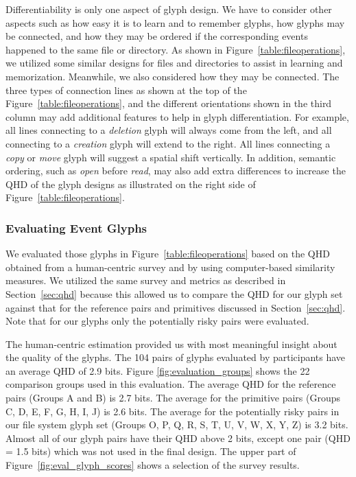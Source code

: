 Differentiability is only one aspect of glyph design.
We have to consider other aspects such as how easy it is to learn and to remember glyphs, how glyphs may be connected, and how they may be ordered if the corresponding events happened to the same file or directory.
As shown in Figure~\ref{table:fileoperations}, we utilized some similar designs for files and directories to assist in learning and memorization.
Meanwhile, we also considered how they may be connected.
The three types of connection lines as shown at the top of the Figure~\ref{table:fileoperations}, and the different orientations shown in the third column may add additional features to help in glyph differentiation.
For example, all lines connecting to a \emph{deletion} glyph will always come from the left, and all connecting to a \emph{creation} glyph will extend to the right.
All lines connecting a \emph{copy} or \emph{move} glyph will suggest a spatial shift vertically.
In addition, semantic ordering, such as \emph{open} before \emph{read}, may also add extra differences to increase the QHD of the glyph designs as illustrated on the right side of Figure~\ref{table:fileoperations}.

\subsubsection{Evaluating Event Glyphs}
\label{sec:eval_glyphs}


We evaluated those glyphs in Figure~\ref{table:fileoperations} based on the QHD obtained from a human-centric survey and by using computer-based similarity measures.
We utilized the same survey and metrics as described in Section~\ref{sec:qhd} because this allowed us to compare the QHD for our glyph set against that for the reference pairs and primitives discussed in Section~\ref{sec:qhd}.
Note that for our glyphs only the potentially risky pairs were evaluated.

The human-centric estimation provided us with most meaningful insight about the quality of the glyphs.
The 104 pairs of glyphs evaluated by participants have an average QHD of 2.9 bits.
Figure \ref{fig:evaluation_groups} shows the 22 comparison groups used in this evaluation. 
The average QHD for the reference pairs (Groups A and B) is 2.7 bits.
The average for the primitive pairs (Groups C, D, E, F, G, H, I, J) is 2.6 bits.
The average for the potentially risky pairs in our file system glyph set (Groups O, P, Q, R, S, T, U, V, W, X, Y, Z) is 3.2 bits.
Almost all of our glyph pairs have their QHD above 2 bits, except one pair (QHD = 1.5 bits) which was not used in the final design.
The upper part of Figure~\ref{fig:eval_glyph_scores} shows a selection of the survey results.

